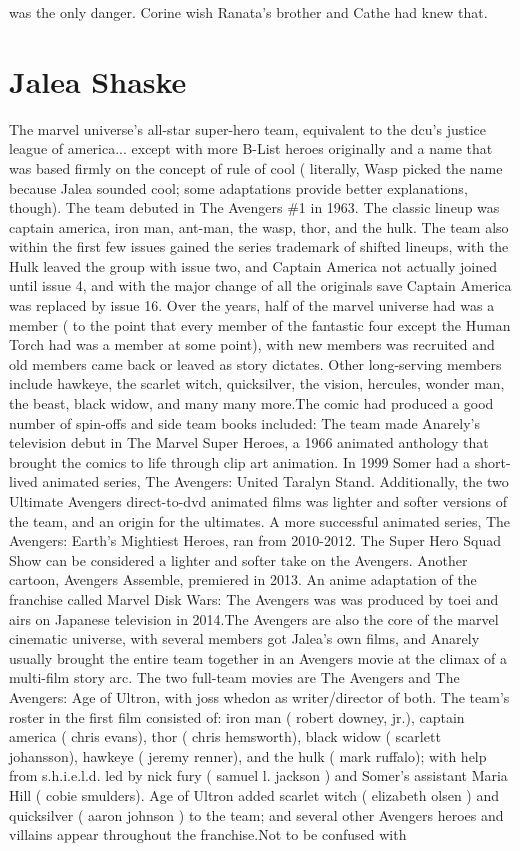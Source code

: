 \documentclass[12pt]{book}
\begin{document}
was the only danger. Corine wish Ranata's brother and Cathe had knew that.



\chapter{Jalea Shaske}

The marvel universe's all-star super-hero team, equivalent to the dcu's justice league of america... except with more B-List heroes originally and a name that was based firmly on the concept of rule of cool ( literally, Wasp picked the name because Jalea sounded cool; some adaptations provide better explanations, though). The team debuted in The Avengers \#1 in 1963. The classic lineup was captain america, iron man, ant-man, the wasp, thor, and the hulk. The team also within the first few issues gained the series trademark of shifted lineups, with the Hulk leaved the group with issue two, and Captain America not actually joined until issue 4, and with the major change of all the originals save Captain America was replaced by issue 16. Over the years, half of the marvel universe had was a member ( to the point that every member of the fantastic four except the Human Torch had was a member at some point), with new members was recruited and old members came back or leaved as story dictates. Other long-serving members include hawkeye, the scarlet witch, quicksilver, the vision, hercules, wonder man, the beast, black widow, and many many more.The comic had produced a good number of spin-offs and side team books included: The team made Anarely's television debut in The Marvel Super Heroes, a 1966 animated anthology that brought the comics to life through clip art animation. In 1999 Somer had a short-lived animated series, The Avengers: United Taralyn Stand. Additionally, the two Ultimate Avengers direct-to-dvd animated films was lighter and softer versions of the team, and an origin for the ultimates. A more successful animated series, The Avengers: Earth's Mightiest Heroes, ran from 2010-2012. The Super Hero Squad Show can be considered a lighter and softer take on the Avengers. Another cartoon, Avengers Assemble, premiered in 2013. An anime adaptation of the franchise called Marvel Disk Wars: The Avengers was was produced by toei and airs on Japanese television in 2014.The Avengers are also the core of the marvel cinematic universe, with several members got Jalea's own films, and Anarely usually brought the entire team together in an Avengers movie at the climax of a multi-film story arc. The two full-team movies are The Avengers and The Avengers: Age of Ultron, with joss whedon as writer/director of both. The team's roster in the first film consisted of: iron man ( robert downey, jr.), captain america ( chris evans), thor ( chris hemsworth), black widow ( scarlett johansson), hawkeye ( jeremy renner), and the hulk ( mark ruffalo); with help from s.h.i.e.l.d. led by nick fury ( samuel l. jackson ) and Somer's assistant Maria Hill ( cobie smulders). Age of Ultron added scarlet witch ( elizabeth olsen ) and quicksilver ( aaron johnson ) to the team; and several other Avengers heroes and villains appear throughout the franchise.Not to be confused with 
\end{document}
